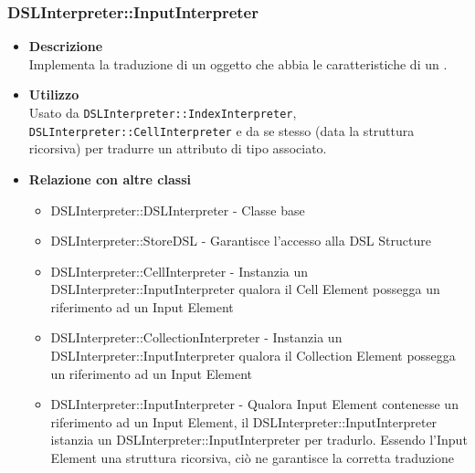 \subsubsection{DSLInterpreter::InputInterpreter}
\begin{itemize}
\item \textbf{Descrizione} \hfill \\
  Implementa la traduzione di un oggetto che abbia le caratteristiche di un .
\item \textbf{Utilizzo} \hfill \\
  Usato da \texttt{DSLInterpreter::IndexInterpreter}, \texttt{DSLInterpreter::CellInterpreter} e da se stesso (data la struttura ricorsiva) per tradurre un attributo di tipo  associato.
\item \textbf{Relazione con altre classi}
  \begin{itemize}
  \item DSLInterpreter::DSLInterpreter - Classe base
  \item DSLInterpreter::StoreDSL - Garantisce l'accesso alla DSL Structure
  \item DSLInterpreter::CellInterpreter - Instanzia un DSLInterpreter::InputInterpreter qualora il Cell Element possegga un riferimento ad un Input Element
  \item DSLInterpreter::CollectionInterpreter - Instanzia un DSLInterpreter::InputInterpreter qualora il Collection Element possegga un riferimento ad un Input Element
  \item DSLInterpreter::InputInterpreter - Qualora Input Element contenesse un riferimento ad un Input Element, il DSLInterpreter::InputInterpreter istanzia un DSLInterpreter::InputInterpreter per tradurlo. Essendo l'Input Element una struttura ricorsiva, ciò ne garantisce la corretta traduzione
  \end{itemize}
\end{itemize}
